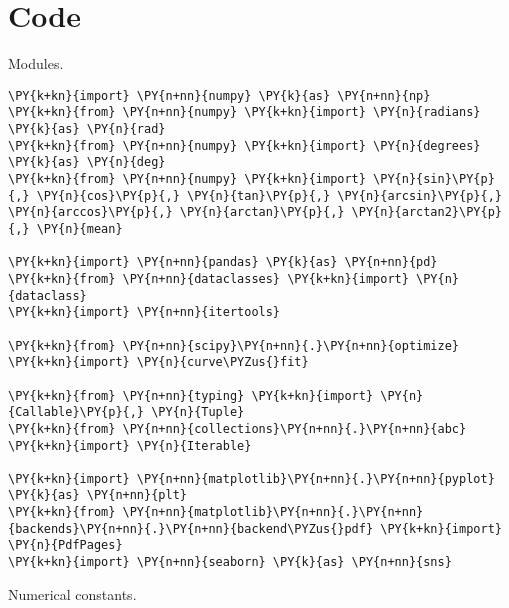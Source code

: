 \chapter{Code}\label{app:code}

    
Modules.

\begin{tcolorbox}[breakable, size=fbox, boxrule=1pt, pad at break*=1mm,colback=cellbackground, colframe=cellborder]
\begin{Verbatim}[commandchars=\\\{\}]
\PY{k+kn}{import} \PY{n+nn}{numpy} \PY{k}{as} \PY{n+nn}{np}
\PY{k+kn}{from} \PY{n+nn}{numpy} \PY{k+kn}{import} \PY{n}{radians} \PY{k}{as} \PY{n}{rad}
\PY{k+kn}{from} \PY{n+nn}{numpy} \PY{k+kn}{import} \PY{n}{degrees} \PY{k}{as} \PY{n}{deg}
\PY{k+kn}{from} \PY{n+nn}{numpy} \PY{k+kn}{import} \PY{n}{sin}\PY{p}{,} \PY{n}{cos}\PY{p}{,} \PY{n}{tan}\PY{p}{,} \PY{n}{arcsin}\PY{p}{,} \PY{n}{arccos}\PY{p}{,} \PY{n}{arctan}\PY{p}{,} \PY{n}{arctan2}\PY{p}{,} \PY{n}{mean}

\PY{k+kn}{import} \PY{n+nn}{pandas} \PY{k}{as} \PY{n+nn}{pd}
\PY{k+kn}{from} \PY{n+nn}{dataclasses} \PY{k+kn}{import} \PY{n}{dataclass}
\PY{k+kn}{import} \PY{n+nn}{itertools}

\PY{k+kn}{from} \PY{n+nn}{scipy}\PY{n+nn}{.}\PY{n+nn}{optimize} \PY{k+kn}{import} \PY{n}{curve\PYZus{}fit}

\PY{k+kn}{from} \PY{n+nn}{typing} \PY{k+kn}{import} \PY{n}{Callable}\PY{p}{,} \PY{n}{Tuple}
\PY{k+kn}{from} \PY{n+nn}{collections}\PY{n+nn}{.}\PY{n+nn}{abc} \PY{k+kn}{import} \PY{n}{Iterable}

\PY{k+kn}{import} \PY{n+nn}{matplotlib}\PY{n+nn}{.}\PY{n+nn}{pyplot} \PY{k}{as} \PY{n+nn}{plt}
\PY{k+kn}{from} \PY{n+nn}{matplotlib}\PY{n+nn}{.}\PY{n+nn}{backends}\PY{n+nn}{.}\PY{n+nn}{backend\PYZus{}pdf} \PY{k+kn}{import} \PY{n}{PdfPages}
\PY{k+kn}{import} \PY{n+nn}{seaborn} \PY{k}{as} \PY{n+nn}{sns}
\end{Verbatim}
\end{tcolorbox}

Numerical constants.

